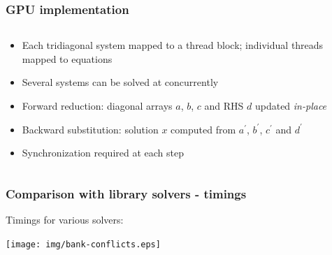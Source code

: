 \documentclass[10pt]{beamer}
\begin{document}
\begin{frame}
\frametitle{GPU implementation}
\begin{columns}
\begin{column}{0.5\textwidth}
\begin{itemize}
\item Each tridiagonal system mapped to a thread block;
    individual threads mapped to equations
\item Several systems can be solved at concurrently
\item Forward reduction: diagonal arrays $a$, $b$, $c$ and RHS $d$
    updated \emph{in-place}
\item Backward substitution: solution $x$ computed
    from $a^\prime$, $b^\prime$, $c^\prime$ and $d^\prime$
\item Synchronization required at each step
\end{itemize}
\end{column}
\begin{column}{0.5\textwidth}
\end{column}
\end{columns}
\end{frame}

\begin{frame}
\frametitle{Comparison with library solvers - timings}
Timings for various solvers:
\begin{table}
\resizebox{\textwidth}{!}{%

}
\end{table}
\end{frame}

\begin{frame}
\texttt{[image: img/bank-conflicts.eps]}
\end{frame}
\end{document}
